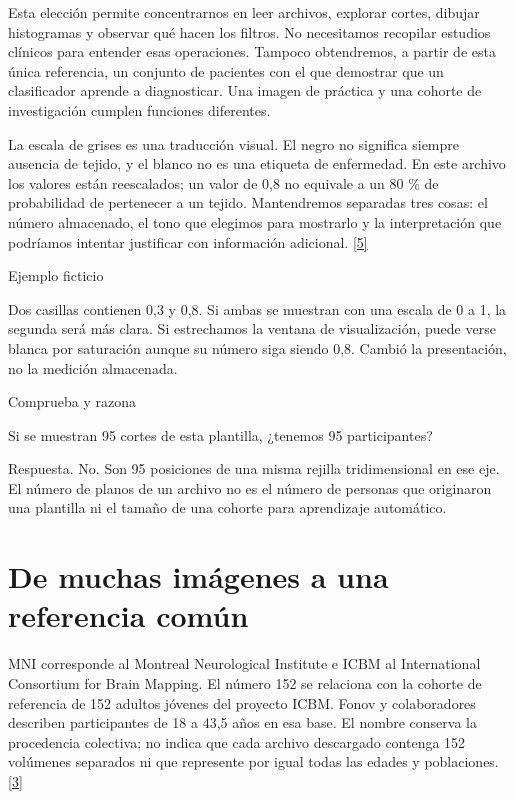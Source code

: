 Esta elección permite concentrarnos en leer archivos, explorar cortes, dibujar histogramas y observar qué hacen los filtros. No necesitamos recopilar estudios clínicos para entender esas operaciones. Tampoco obtendremos, a partir de esta única referencia, un conjunto de pacientes con el que demostrar que un clasificador aprende a diagnosticar. Una imagen de práctica y una cohorte de investigación cumplen funciones diferentes.


La escala de grises es una traducción visual. El negro no significa siempre ausencia de tejido, y el blanco no es una etiqueta de enfermedad. En este archivo los valores están reescalados; un valor de 0,8 no equivale a un 80 \% de probabilidad de pertenecer a un tejido. Mantendremos separadas tres cosas: el número almacenado, el tono que elegimos para mostrarlo y la interpretación que podríamos intentar justificar con información adicional. \hyperlink{refR5}{[5]}



\begin{Idea}{Ejemplo ficticio}

Dos casillas contienen 0,3 y 0,8. Si ambas se muestran con una escala de 0 a 1, la segunda será más clara. Si estrechamos la ventana de visualización, puede verse blanca por saturación aunque su número siga siendo 0,8. Cambió la presentación, no la medición almacenada.


\end{Idea}


\begin{Practica}{Comprueba y razona}

Si se muestran 95 cortes de esta plantilla, ¿tenemos 95 participantes?


Respuesta. No. Son 95 posiciones de una misma rejilla tridimensional en ese eje. El número de planos de un archivo no es el número de personas que originaron una plantilla ni el tamaño de una cohorte para aprendizaje automático.


\end{Practica}

\section{De muchas imágenes a una referencia común}

MNI corresponde al Montreal Neurological Institute e ICBM al International Consortium for Brain Mapping. El número 152 se relaciona con la cohorte de referencia de 152 adultos jóvenes del proyecto ICBM. Fonov y colaboradores describen participantes de 18 a 43,5 años en esa base. El nombre conserva la procedencia colectiva; no indica que cada archivo descargado contenga 152 volúmenes separados ni que represente por igual todas las edades y poblaciones. \hyperlink{refR3}{[3]}


